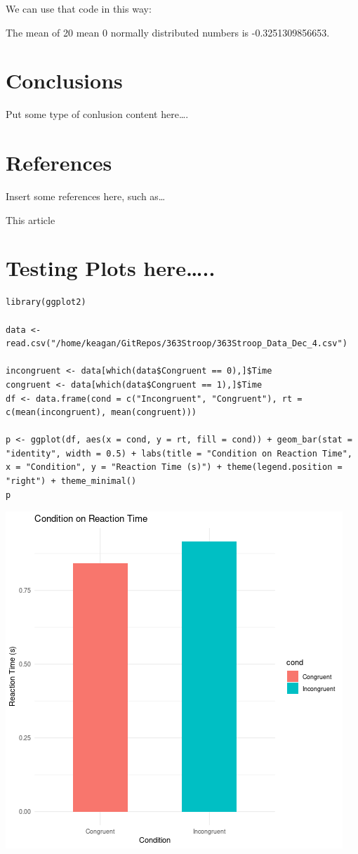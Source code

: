 \documentclass{article}
\begin{document}
We can use that code in this way:

The mean of 20 mean 0 normally distributed numbers is -0.3251309856653.


\section{Conclusions}
\label{sec:orgebe2160}

Put some type of conlusion content here\ldots{}.



\section{References}
\label{sec:org8633c68}

Insert some references here, such as\ldots{}

This article \cite{britt}




\section{Testing Plots here\ldots{}..}
\label{sec:orgdd5fd9f}
\begin{verbatim}
library(ggplot2)

data <- read.csv("/home/keagan/GitRepos/363Stroop/363Stroop_Data_Dec_4.csv")

incongruent <- data[which(data$Congruent == 0),]$Time
congruent <- data[which(data$Congruent == 1),]$Time
df <- data.frame(cond = c("Incongruent", "Congruent"), rt = c(mean(incongruent), mean(congruent)))

p <- ggplot(df, aes(x = cond, y = rt, fill = cond)) + geom_bar(stat = "identity", width = 0.5) + labs(title = "Condition on Reaction Time", x = "Condition", y = "Reaction Time (s)") + theme(legend.position = "right") + theme_minimal()
p
\end{verbatim}

\begin{center}
\includegraphics[width=.9\linewidth]{barplot_stroop.png}
\end{center}
\end{document}
